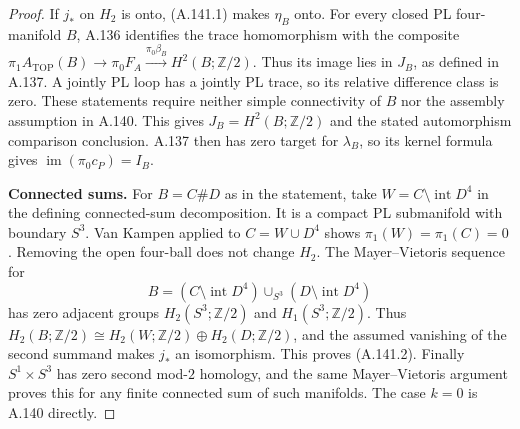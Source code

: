 \begin{proof}
If $j_*$ on $H_2$ is onto, (A.141.1) makes $\eta_B$ onto.
For every closed PL four-manifold $B$, A.136 identifies
the trace homomorphism with the composite
$\pi_1A_{\mathrm{TOP}}(B)\to\pi_0F_A
\xrightarrow{\pi_0\beta_B}H^2(B;\mathbb Z/2)$.
Thus its image lies in $J_B$, as defined in A.137.
A jointly PL loop has a jointly PL trace, so its
relative difference class is zero. These statements
require neither simple connectivity of $B$ nor the
assembly assumption in A.140. This gives
$J_B=H^2(B;\mathbb Z/2)$ and the stated automorphism
comparison conclusion. A.137 then has zero target for
$\lambda_B$, so its kernel formula gives
$\operatorname{im}(\pi_0c_P)=I_B$.

\textbf{Connected sums.}
For $B=C\#D$ as in the statement, take
$W=C\setminus\operatorname{int}D^4$ in the defining
connected-sum decomposition. It is a compact PL
submanifold with boundary $S^3$. Van Kampen applied
to $C=W\cup D^4$ shows $\pi_1(W)=\pi_1(C)=0$.
Removing the open four-ball does not change $H_2$.
The Mayer--Vietoris sequence for
\[
 B=(C\setminus\operatorname{int}D^4)
       \cup_{S^3}(D\setminus\operatorname{int}D^4)
\]
has zero adjacent groups $H_2(S^3;\mathbb Z/2)$ and
$H_1(S^3;\mathbb Z/2)$. Thus
$H_2(B;\mathbb Z/2)\cong H_2(W;\mathbb Z/2)
\oplus H_2(D;\mathbb Z/2)$, and the assumed vanishing
of the second summand makes $j_*$ an isomorphism.
This proves (A.141.2). Finally $S^1\times S^3$ has zero
second mod-$2$ homology, and the same Mayer--Vietoris
argument proves this for any finite connected sum of
such manifolds. The case $k=0$ is A.140 directly.
\end{proof}

